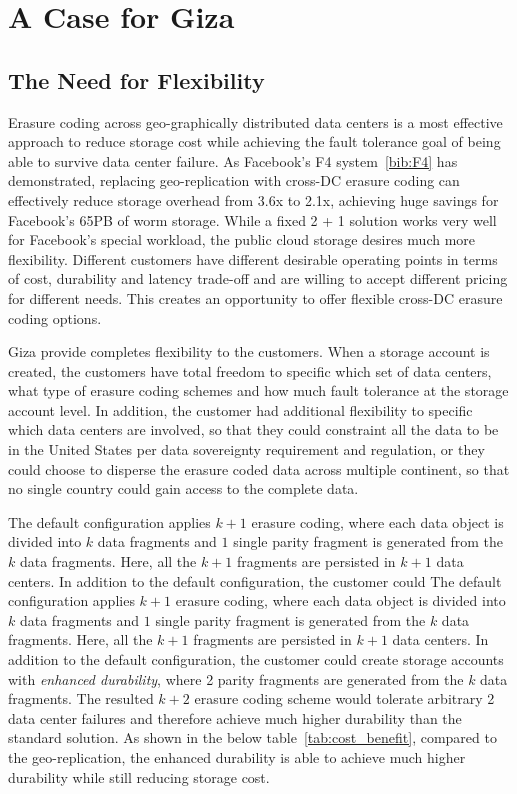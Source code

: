 \section{A Case for Giza}

\subsection{The Need for Flexibility}

Erasure coding across geo-graphically distributed data centers is a most effective approach to reduce storage cost while achieving the fault tolerance goal of being able to survive data center failure. As Facebook's F4 system~\ref{bib:F4} has demonstrated, replacing geo-replication with cross-DC erasure coding can effectively reduce storage overhead from 3.6x to 2.1x, achieving huge savings for Facebook's 65PB of worm storage. While a fixed 2 + 1 solution works very well for Facebook's special workload, the public cloud storage desires much more flexibility. Different customers have different desirable operating points in terms of cost, durability and latency trade-off and are willing to accept different pricing for different needs. This creates an opportunity to offer flexible cross-DC erasure coding options.

Giza provide completes flexibility to the customers. When a storage account is created, the customers have total freedom to specific which set of data centers, what type of erasure coding schemes and how much fault tolerance at the storage account level. In addition, the customer had additional flexibility to specific which data centers are involved, so that they could constraint all the data to be in the United States per data sovereignty requirement and regulation, or they could choose to disperse the erasure coded data across multiple continent, so that no single country could gain access to the complete data.

The default configuration applies $k+1$ erasure coding, where each data object is divided into $k$ data fragments and $1$ single parity fragment is generated from the $k$ data fragments. Here, all the $k+1$ fragments are persisted in $k+1$ data centers. In addition to the default configuration, the customer could 
The default configuration applies $k+1$ erasure coding, where each data object is divided into $k$ data fragments and $1$ single parity fragment is generated from the $k$ data fragments. Here, all the $k+1$ fragments are persisted in $k+1$ data centers. In addition to the default configuration, the customer could create storage accounts with {\em enhanced durability}, where 2 parity fragments are generated from the $k$ data fragments. The resulted $k+2$ erasure coding scheme would tolerate arbitrary 2 data center failures and therefore achieve much higher durability than the standard solution. As shown in the below table~\ref{tab:cost_benefit}, compared to the geo-replication, the enhanced durability is able to achieve much higher durability while still reducing storage cost.

